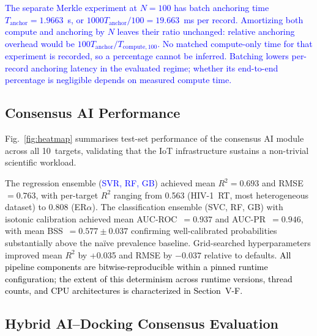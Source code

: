 \documentclass[conference]{IEEEtran}
\newcommand{\rev}[2]{\textcolor{blue}{#2}}
\begin{document}
\rev{R1.4, R2.2}{The separate Merkle experiment at $N{=}100$
has batch anchoring time $T_{\mathrm{anchor}}=1.9663$~s,
or $1000T_{\mathrm{anchor}}/100=19.663$~ms per record.
Amortizing both compute and anchoring by $N$ leaves their
ratio unchanged: relative anchoring overhead would be
$100T_{\mathrm{anchor}}/T_{\mathrm{compute},100}$.
No matched compute-only time for that experiment is recorded,
so a percentage cannot be inferred. Batching lowers per-record anchoring
latency in the evaluated regime; whether its end-to-end
percentage is negligible depends on measured compute time.}

\subsection{\textbf{Consensus AI Performance}}
\label{sec:ai-results}

Fig.~\ref{fig:heatmap} summarises test-set performance of
the consensus AI module across all 10~targets, validating
that the IoT infrastructure sustains a non-trivial
scientific workload.



The regression ensemble (\rev{R2.1}{SVR, RF, GB}) achieved mean
$R^2{=}0.693$ and RMSE~$=0.763$, with per-target $R^2$
ranging from 0.563 (HIV-1~RT, most heterogeneous dataset)
to 0.808 (ER$\alpha$).
The classification ensemble (SVC, RF, GB) with isotonic
calibration achieved mean AUC-ROC~$=0.937$ and
AUC-PR~$=0.946$, with mean BSS~$=0.577{\pm}0.037$
confirming well-calibrated probabilities substantially
above the na\"ive prevalence baseline.
Grid-searched hyperparameters improved mean $R^2$ by +0.035 and RMSE by
$-0.037$ relative to defaults. \textcolor{black}{All pipeline components are
bitwise-reproducible within a pinned runtime configuration; the extent of
this determinism across runtime versions, thread counts, and CPU
architectures is characterized in Section~V-F.}


\subsection{\textbf{Hybrid AI--Docking Consensus Evaluation}}
\label{sec:hybrid-results}
\end{document}
